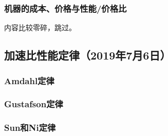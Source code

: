 \documentclass{article}
\begin{document}
			\subsubsection{机器的成本、价格与性能/价格比}
				内容比较零碎，跳过。
		\subsection{加速比性能定律（2019年7月6日）}
			\subsubsection{Amdahl定律}
			\subsubsection{Gustafson定律}
			\subsubsection{Sun和Ni定律}
\end{document}
